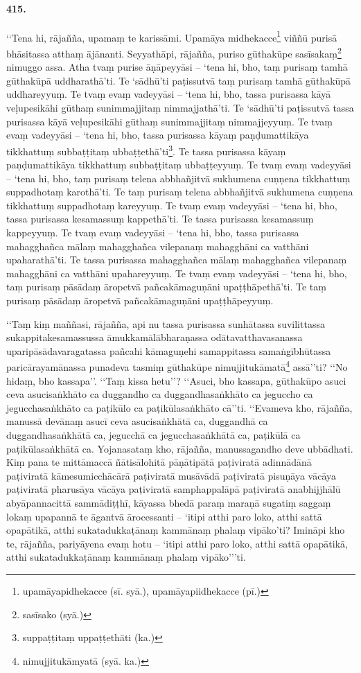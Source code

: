 \paragraph{415.} ‘‘Tena hi, rājañña, upamaṃ te karissāmi. Upamāya midhekacce\footnote{upamāyapidhekacce (sī. syā.), upamāyapiidhekacce (pī.)} viññū purisā bhāsitassa atthaṃ ājānanti. Seyyathāpi, rājañña, puriso gūthakūpe sasīsakaṃ\footnote{sasīsako (syā.)} nimuggo assa. Atha tvaṃ purise āṇāpeyyāsi – ‘tena hi, bho, taṃ purisaṃ tamhā gūthakūpā uddharathā’ti. Te ‘sādhū’ti paṭissutvā taṃ purisaṃ tamhā gūthakūpā uddhareyyuṃ. Te tvaṃ evaṃ vadeyyāsi – ‘tena hi, bho, tassa purisassa kāyā veḷupesikāhi gūthaṃ sunimmajjitaṃ nimmajjathā’ti. Te ‘sādhū’ti paṭissutvā tassa purisassa kāyā veḷupesikāhi gūthaṃ sunimmajjitaṃ nimmajjeyyuṃ. Te tvaṃ evaṃ vadeyyāsi – ‘tena hi, bho, tassa purisassa kāyaṃ paṇḍumattikāya tikkhattuṃ subbaṭṭitaṃ ubbaṭṭethā’ti\footnote{suppaṭṭitaṃ uppaṭṭethāti (ka.)}. Te tassa purisassa kāyaṃ paṇḍumattikāya tikkhattuṃ subbaṭṭitaṃ ubbaṭṭeyyuṃ. Te tvaṃ evaṃ vadeyyāsi – ‘tena hi, bho, taṃ purisaṃ telena abbhañjitvā sukhumena cuṇṇena tikkhattuṃ suppadhotaṃ karothā’ti. Te taṃ purisaṃ telena abbhañjitvā sukhumena cuṇṇena tikkhattuṃ suppadhotaṃ kareyyuṃ. Te tvaṃ evaṃ vadeyyāsi – ‘tena hi, bho, tassa purisassa kesamassuṃ kappethā’ti. Te tassa purisassa kesamassuṃ kappeyyuṃ. Te tvaṃ evaṃ vadeyyāsi – ‘tena hi, bho, tassa purisassa mahagghañca mālaṃ mahagghañca vilepanaṃ mahagghāni ca vatthāni upaharathā’ti. Te tassa purisassa mahagghañca mālaṃ mahagghañca vilepanaṃ mahagghāni ca vatthāni upahareyyuṃ. Te tvaṃ evaṃ vadeyyāsi – ‘tena hi, bho, taṃ purisaṃ pāsādaṃ āropetvā pañcakāmaguṇāni upaṭṭhāpethā’ti. Te taṃ purisaṃ pāsādaṃ āropetvā pañcakāmaguṇāni upaṭṭhāpeyyuṃ.

‘‘Taṃ kiṃ maññasi, rājañña, api nu tassa purisassa sunhātassa suvilittassa sukappitakesamassussa āmukkamālābharaṇassa odātavatthavasanassa uparipāsādavaragatassa pañcahi kāmaguṇehi samappitassa samaṅgībhūtassa paricārayamānassa punadeva tasmiṃ gūthakūpe nimujjitukāmatā\footnote{nimujjitukāmyatā (syā. ka.)} assā’’ti? ‘‘No hidaṃ, bho kassapa’’. ‘‘Taṃ kissa hetu’’? ‘‘Asuci, bho kassapa, gūthakūpo asuci ceva asucisaṅkhāto ca duggandho ca duggandhasaṅkhāto ca jeguccho ca jegucchasaṅkhāto ca paṭikūlo ca paṭikūlasaṅkhāto cā’’ti. ‘‘Evameva kho, rājañña, manussā devānaṃ asucī ceva asucisaṅkhātā ca, duggandhā ca duggandhasaṅkhātā ca, jegucchā ca jegucchasaṅkhātā ca, paṭikūlā ca paṭikūlasaṅkhātā ca. Yojanasataṃ kho, rājañña, manussagandho deve ubbādhati. Kiṃ pana te mittāmaccā ñātisālohitā pāṇātipātā paṭiviratā adinnādānā paṭiviratā kāmesumicchācārā paṭiviratā musāvādā paṭiviratā pisuṇāya vācāya paṭiviratā pharusāya vācāya paṭiviratā samphappalāpā paṭiviratā anabhijjhālū abyāpannacittā sammādiṭṭhī, kāyassa bhedā paraṃ maraṇā sugatiṃ saggaṃ lokaṃ upapannā te āgantvā ārocessanti – ‘itipi atthi paro loko, atthi sattā opapātikā, atthi sukatadukkaṭānaṃ kammānaṃ phalaṃ vipāko’ti? Imināpi kho te, rājañña, pariyāyena evaṃ hotu – ‘itipi atthi paro loko, atthi sattā opapātikā, atthi sukatadukkaṭānaṃ kammānaṃ phalaṃ vipāko’’’ti.


